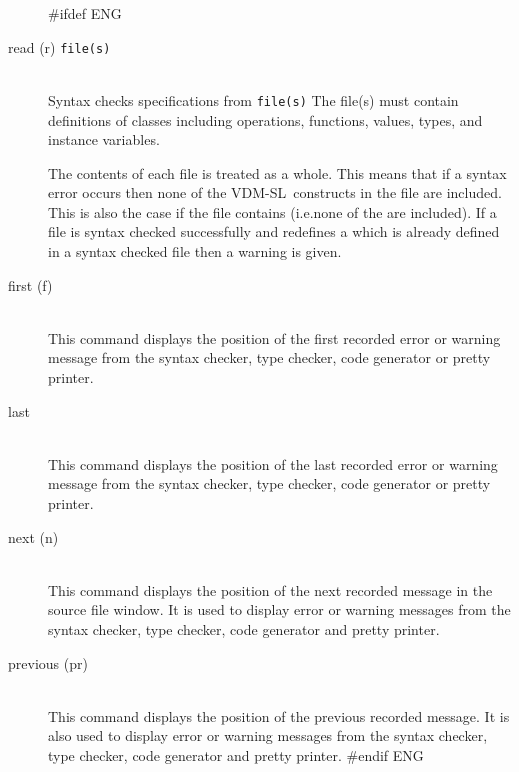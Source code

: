 \documentclass[\pformat,12pt]{article}
\newcommand{\vdmslpp}{VDM-SL}
\newcommand{\vdmslpp}{VDM++}
\begin{document}
\begin{description}
#ifdef ENG
\item[read (r) {\tt file(s)}] \mbox{}\\
  Syntax checks specifications from {\tt file(s)}
    {The file(s) must contain definitions of classes
    including operations, functions, values, types, and instance
    variables.}

  The contents of each file is treated as a whole.  This means that
  if a syntax error occurs then none of the \vdmslpp\ constructs in
  the file are included.  This is also the case if the file contains
  (i.e.none of the
   are included).  If a
  file is syntax checked successfully and redefines a 
   which
  is already defined in a syntax checked file then a warning is
  given.

\item[first (f)] \mbox{}\\
  This command displays the position of the first recorded error or
  warning message from the syntax checker, type checker, code
  generator or pretty printer.

\item[last] \mbox{}\\
  This command displays the position of the last recorded error or
  warning message from the syntax checker, type checker, code
  generator or pretty printer.

\item[next (n) \index{next command}]\mbox{}\\
  This command displays the position of the next recorded message in
  the source file window.  It is used to display error or warning
  messages from the syntax checker, type checker, code generator and
  pretty printer.

\item[previous (pr)] \mbox{}\\
  This command displays the position of the previous recorded message.
  It is also used to display error or warning messages from the syntax
  checker, type checker, code generator and pretty printer.
#endif ENG


\end{description}
\end{document}
